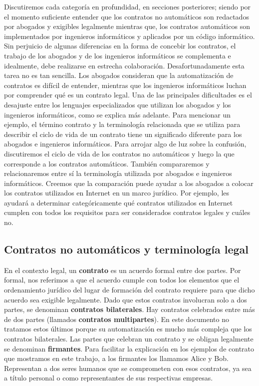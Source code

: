 \documentclass[12pt]{report} %
\begin{document}
\begin{itemize}
Discutiremos cada categoría en profundidad, en secciones posteriores; siendo por el momento suficiente entender que los contratos no automáticos son redactados por abogados y exigibles legalmente mientras que, los contratos automáticos son implementados por ingenieros informáticos y aplicados por un código informático. Sin perjuicio de algunas diferencias en la forma de concebir los contratos, el trabajo de los abogados y de los ingenieros informáticos se complementa e idealmente, debe realizarse en estrecha colaboración. Desafortunadamente esta tarea no es tan sencilla. Los abogados consideran que la automatización de contratos es difícil de entender, mientras que los ingenieros informáticos luchan por comprender qué es un contrato legal. Una de las principales dificultades es el desajuste entre los lenguajes especializados que utilizan los abogados y los ingenieros informáticos, como se explica más adelante. Para mencionar un ejemplo, el término contrato y la terminología relacionada que se utiliza para describir el ciclo de vida de un contrato tiene un significado diferente para los abogados e ingenieros informáticos. Para arrojar algo de luz sobre la confusión, discutiremos el ciclo de vida de los contratos no automáticos y luego la que corresponde a los contratos automáticos. También compararemos y relacionaremos entre sí la terminología utilizada por abogados e ingenieros informáticos. Creemos que la comparación puede ayudar a los abogados a colocar los contratos utilizados en Internet en un marco jurídico. Por ejemplo, les ayudará a determinar categóricamente qué contratos utilizados en Internet cumplen con todos los requisitos para ser considerados contratos legales y cuáles no.

\subsection{Contratos no automáticos y terminología legal}

En el contexto legal, un \textbf{contrato} es un acuerdo formal entre dos partes. Por formal, nos referimos a que el acuerdo cumple con todos los elementos que el ordenamiento jurídico del lugar de formación del contrato requiere para que dicho acuerdo sea exigible legalmente. Dado que estos contratos involucran solo a dos partes, se denominan \textbf{contratos bilaterales}. Hay contratos celebrados entre más de dos partes (llamados \textbf{contratos multipartes}). En este documento no tratamos estos últimos porque su automatización es mucho más compleja que los contratos bilaterales. Las partes que celebran un contrato y se obligan legalmente se denominan \textbf{firmantes}. Para facilitar la explicación en los ejemplos de contrato que mostramos en este trabajo, a los firmantes los llamamos Alice y Bob. Representan a dos seres humanos que se comprometen con esos contratos, ya sea a título personal o como representantes de sus respectivas empresas.



\end{itemize}
\end{document}
